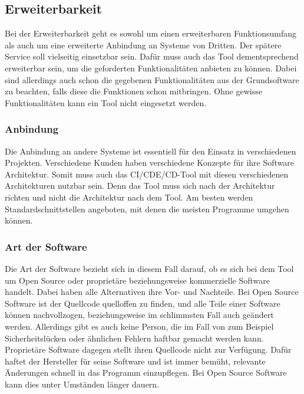 \subsection{Erweiterbarkeit}
Bei der Erweiterbarkeit geht es sowohl um einen erweiterbaren Funktionsumfang als auch um eine erweiterte Anbindung an Systeme von Dritten. Der spätere Service soll vielseitig einsetzbar sein. Dafür muss auch das Tool dementsprechend erweiterbar sein, um die geforderten Funktionalitäten anbieten zu können. Dabei sind allerdings auch schon die gegebenen Funktionalitäten aus der Grundsoftware zu beachten, falls diese die Funktionen schon mitbringen. Ohne gewisse Funktionalitäten kann ein Tool nicht eingesetzt werden.
\subsubsection{Anbindung}
Die Anbindung an andere Systeme ist essentiell für den Einsatz in verschiedenen Projekten. Verschiedene Kunden haben verschiedene Konzepte für ihre Software Architektur. Somit muss auch das \ac{CI}/\ac{CDE}/\ac{CD}-Tool mit diesen verschiedenen Architekturen nutzbar sein. Denn das Tool muss sich nach der Architektur richten und nicht die Architektur nach dem Tool. Am besten werden Standardschnittstellen angeboten, mit denen die meisten Programme umgehen können.
\subsubsection{Art der Software}
Die Art der Software bezieht sich in diesem Fall darauf, ob es sich bei dem Tool um  Open Source oder proprietäre beziehungsweise kommerzielle Software handelt. Dabei haben alle Alternativen ihre Vor- und Nachteile. Bei Open Source Software ist der Quellcode quelloffen zu finden, und alle Teile einer Software können nachvollzogen, beziehungsweise im schlimmsten Fall auch geändert werden. Allerdings gibt es auch keine Person, die im Fall von zum Beispiel Sicherheitslücken oder ähnlichen Fehlern haftbar gemacht werden kann. Proprietäre Software dagegen stellt ihren Quellcode nicht zur Verfügung. Dafür haftet der Hersteller für seine Software und ist immer bemüht, relevante Änderungen schnell in das Programm einzupflegen. Bei Open Source Software kann dies unter Umständen länger dauern.
